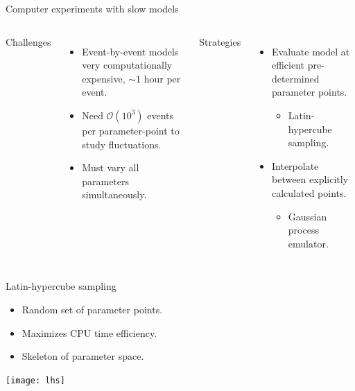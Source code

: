 \documentclass{beamer}
\begin{document}
\begin{frame}{Computer experiments with slow models}
  \begin{columns}[t]
    \begin{center}
      \large\bf
      \strut Challenges
    \end{center}
    \begin{itemize}
      \item Event-by-event models very computationally expensive, ${\sim}1$ hour per event.
      \item Need $\mathcal O(10^3)$ events per parameter-point to study fluctuations.
      \item Must vary all parameters simultaneously.
    \end{itemize}

    \begin{center}
      \large\bf
      \strut Strategies
    \end{center}
    \begin{itemize}
      \item Evaluate model at efficient pre-determined parameter points.
        \begin{itemize}
          \item Latin-hypercube sampling.
        \end{itemize}
      \item Interpolate between explicitly calculated points.
        \begin{itemize}
          \item Gaussian process emulator.
        \end{itemize}
    \end{itemize}
  \end{columns}
\end{frame}


\begin{frame}{Latin-hypercube sampling}
  \begin{itemize}
    \item Random set of parameter points.
    \item Maximizes CPU time efficiency.
    \item Skeleton of parameter space.
  \end{itemize}

  \bgs 

  \centering
  \texttt{[image: lhs]}
\end{frame}
\end{document}
